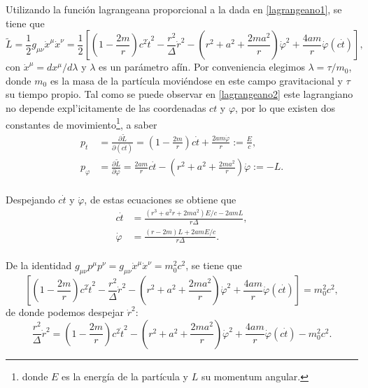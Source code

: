 Utilizando la funci\'on lagrangeana proporcional a la dada en \eqref{lagrangeano1}, se tiene que
\begin{equation}\label{lagrangeano2}
\tilde{L}=\frac{1}{2}g_{\mu \nu} \dot{x}^{\mu} \dot{x}^{\nu}=\frac{1}{2}\left[\left(1-\frac{2m}{r}\right)c^2\dot{t}^2-\frac{r^2}{\Delta}\dot{r}^2-\left(r^2+a^2+\frac{2ma^2}{r}\right)\dot{\varphi}^2
+\frac{4am}{r}\dot{\varphi}(c\dot{t}) \right],
\end{equation}
con $\dot{x}^{\mu}=dx^{\mu}/d \lambda$ y $\lambda$ es un par\'ametro af\'in. Por conveniencia elegimos $\lambda=\tau/m_0$, donde $m_0$ es la masa de la part\'icula movi\'endose en este campo gravitacional y $\tau$ su tiempo propio. Tal como se puede observar en \eqref{lagrangeano2} este lagrangiano no depende expl'icitamente de las coordenadas $ct$ y $\varphi$, por lo que existen dos constantes de movimiento\footnote{donde $E$ es la energ\'ia de la part\'icula y $L$ su momentum angular.}, a saber
\begin{equation}
\begin{aligned}
p_{t}&=\frac{\partial \tilde{L}}{\partial(c\dot{t})}=\left(1-\frac{2m}{r}\right)c\dot{t}+\frac{2am\dot{\varphi}}{r}:=\frac{E}{c},\\ 
p_{\varphi}&=\frac{\partial \tilde{L}}{\partial \dot{\varphi}}=\frac{2am}{r}c\dot{t}-\left(r^2+a^2+\frac{2ma^2}{r}\right)\dot{\varphi}:=-L.\\
\end{aligned}
\end{equation}

Despejando $c\dot{t}$ y $\dot{\varphi}$, de estas ecuaciones se obtiene que
\begin{equation}
\begin{aligned}
c\dot{t}&=\frac{(r^3+a^2r+2ma^2)E/c-2amL}{r\Delta},\\ \label{dottdotphi}
\dot{\varphi}&=\frac{(r-2m)L+2amE/c}{r\Delta}.\\
\end{aligned}
\end{equation}

De la identidad $g_{\mu \nu}p^{\mu} p^{\nu}=g_{\mu \nu}\dot{x}^{\mu}\dot{x}^{\nu}=m_0^2c^2$, se tiene que 
\begin{equation}\label{pp=m2c2}
\left[\left(1-\frac{2m}{r}\right)c^2\dot{t}^2-\frac{r^2}{\Delta}\dot{r}^2-\left(r^2+a^2+\frac{2ma^2}{r}\right)\dot{\varphi}^2
+\frac{4am}{r}\dot{\varphi}(c\dot{t}) \right]=m_0^2c^2,
\end{equation}
de donde podemos despejar $\dot{r}^2$:
\begin{equation}\label{dotr}
\frac{r^2}{\Delta}\dot{r}^2=\left(1-\frac{2m}{r}\right)c^2\dot{t}^2-\left(r^2+a^2+\frac{2ma^2}{r}\right)\dot{\varphi}^2
+\frac{4am}{r}\dot{\varphi}(c\dot{t}) -m_0^2c^2.
\end{equation}

